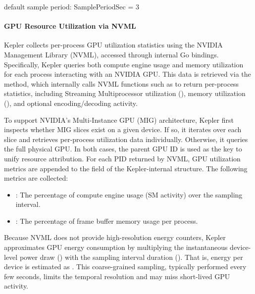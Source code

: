 default sample period: SamplePeriodSec = 3 















\paragraph{GPU Resource Utilization via NVML}

Kepler collects per-process GPU utilization statistics using the NVIDIA Management Library (NVML), accessed through internal Go bindings. Specifically, Kepler queries both compute engine usage and memory utilization for each process interacting with an NVIDIA GPU. This data is retrieved via the  method, which internally calls NVML functions such as  to return per-process statistics, including Streaming Multiprocessor utilization (), memory utilization (), and optional encoding/decoding activity.

To support NVIDIA's Multi-Instance GPU (MIG) architecture, Kepler first inspects whether MIG slices exist on a given device. If so, it iterates over each slice and retrieves per-process utilization data individually. Otherwise, it queries the full physical GPU. In both cases, the parent GPU ID is used as the key to unify resource attribution. For each PID returned by NVML, GPU utilization metrics are appended to the  field of the Kepler-internal  structure. The following metrics are collected:
\begin{itemize}
  \item {}: The percentage of compute engine usage (SM activity) over the sampling interval.
  \item {}: The percentage of frame buffer memory usage per process.
\end{itemize}

Because NVML does not provide high-resolution energy counters, Kepler approximates GPU energy consumption by multiplying the instantaneous device-level power draw () with the sampling interval duration (). That is, energy per device is estimated as . This coarse-grained sampling, typically performed every few seconds, limits the temporal resolution and may miss short-lived GPU activity.

